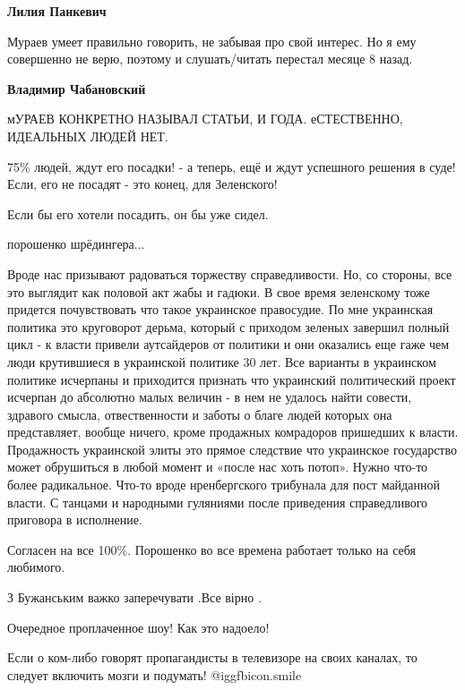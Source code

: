 \begin{itemize}
\begin{itemize}
\textbf{Лилия Панкевич} 

Мураев умеет правильно говорить, не забывая про свой интерес. Но я ему
совершенно не верю, поэтому и слушать/читать перестал месяце 8 назад.

\textbf{Владимир Чабановский} 

мУРАЕВ КОНКРЕТНО НАЗЫВАЛ СТАТЬИ, И ГОДА. еСТЕСТВЕННО, ИДЕАЛЬНЫХ ЛЮДЕЙ НЕТ.

\end{itemize} %

75\% людей, ждут его посадки! - а теперь, ещё и ждут успешного решения в суде!
Если, его не посадят - это конец, для Зеленского!

Если бы его хотели посадить, он бы уже сидел.


порошенко шрёдингера...


Вроде нас призывают радоваться торжеству справедливости. Но, со стороны, все
это выглядит как половой акт жабы и гадюки. В свое время зеленскому тоже
придется почувствовать что такое украинское правосудие. По мне украинская
политика это круговорот дерьма, который с приходом зеленых завершил полный
цикл - к власти привели аутсайдеров от политики и они оказались еще гаже чем
люди крутившиеся в украинской политике 30 лет. Все варианты в украинском
политике исчерпаны и приходится признать что украинский политический проект
исчерпан до абсолютно малых величин - в нем не удалось найти совести, здравого
смысла, отвественности и заботы о благе людей которых она представляет,
вообще ничего, кроме продажных комрадоров пришедших к власти. Продажность
украинской элиты это прямое следствие что украинское государство может
обрушиться в любой момент и «после нас хоть потоп». Нужно что-то более
радикальное. Что-то вроде нренбергского трибунала для пост майданной власти. С
танцами и народными гуляниями после приведения справедливого приговора в
исполнение.

Согласен на все 100\%. Порошенко во все времена работает только на себя любимого.

З Бужанським важко заперечувати .Все вірно .

Очередное проплаченное шоу! Как это надоело!

Если о ком-либо говорят пропагандисты в телевизоре на своих каналах, то следует включить мозги и подумать!  @igg{fbicon.smile} 


\end{itemize}
